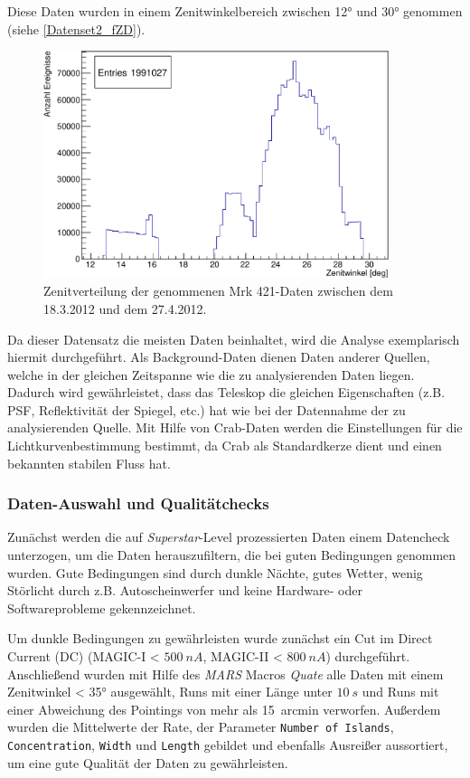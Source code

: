 Diese Daten wurden in einem Zenitwinkelbereich zwischen 12° und 30° genommen (siehe \autoref{Datenset2_fZD}).

\begin{figure}
    \centering
    \includegraphics[width=0.9\textwidth]{./Plots/04_MrkAnalyse/Datenset2/Datenset2_Mrk421_MPointingPos_fZd.pdf}
    \caption{Zenitverteilung der genommenen Mrk 421-Daten zwischen dem 18.3.2012 und dem 27.4.2012.}
    \label{Datenset2_fZD}
\end{figure}


Da dieser Datensatz die meisten Daten beinhaltet, wird die Analyse exemplarisch hiermit durchgeführt.
Als Background-Daten dienen Daten anderer Quellen, welche in der gleichen Zeitspanne wie die zu analysierenden Daten liegen.
Dadurch wird gewährleistet, dass das Teleskop die gleichen Eigenschaften (z.B. PSF, Reflektivität der Spiegel, etc.) hat wie bei der Datennahme der zu analysierenden Quelle. 
Mit Hilfe von Crab-Daten werden die Einstellungen für die Lichtkurvenbestimmung bestimmt, da Crab als Standardkerze dient und einen bekannten stabilen Fluss hat. 


\subsubsection{Daten-Auswahl und Qualitätchecks}
Zunächst werden die auf \textit{Superstar}-Level prozessierten Daten einem Datencheck unterzogen, um die Daten herauszufiltern, die bei guten Bedingungen genommen wurden.
Gute Bedingungen sind durch dunkle Nächte, gutes Wetter, wenig Störlicht durch z.B. Autoscheinwerfer und keine Hardware- oder Softwareprobleme gekennzeichnet.

Um dunkle Bedingungen zu gewährleisten wurde zunächst ein Cut im Direct Current (DC) (MAGIC-I < $\SI{500}{nA}$, MAGIC-II < $\SI{800}{nA}$) durchgeführt.
Anschließend wurden mit Hilfe des \textit{MARS} Macros \textit{Quate} alle Daten mit einem Zenitwinkel < 35° ausgewählt, Runs mit einer Länge unter $\SI{10}{s}$ und Runs mit einer Abweichung des Pointings von mehr als \SI{15}{arcmin} verworfen.
Außerdem wurden die Mittelwerte der Rate, der Parameter \texttt{Number of Islands}, \texttt{Concentration}, \texttt{Width} und \texttt{Length} gebildet und ebenfalls Ausreißer aussortiert, um eine gute Qualität der Daten zu gewährleisten.

